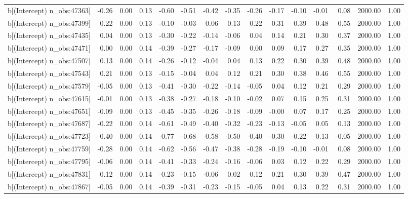 \begin{table}[ht]
\begin{tabular}{rrrrrrrrrrrrrrr}
  b[(Intercept) n\_obs:47363] & -0.26 & 0.00 & 0.13 & -0.60 & -0.51 & -0.42 & -0.35 & -0.26 & -0.17 & -0.10 & -0.01 & 0.08 & 2000.00 & 1.00 \\ 
  b[(Intercept) n\_obs:47399] & 0.22 & 0.00 & 0.13 & -0.10 & -0.03 & 0.06 & 0.13 & 0.22 & 0.31 & 0.39 & 0.48 & 0.55 & 2000.00 & 1.00 \\ 
  b[(Intercept) n\_obs:47435] & 0.04 & 0.00 & 0.13 & -0.30 & -0.22 & -0.14 & -0.06 & 0.04 & 0.14 & 0.21 & 0.30 & 0.37 & 2000.00 & 1.00 \\ 
  b[(Intercept) n\_obs:47471] & 0.00 & 0.00 & 0.14 & -0.39 & -0.27 & -0.17 & -0.09 & 0.00 & 0.09 & 0.17 & 0.27 & 0.35 & 2000.00 & 1.00 \\ 
  b[(Intercept) n\_obs:47507] & 0.13 & 0.00 & 0.14 & -0.26 & -0.12 & -0.04 & 0.04 & 0.13 & 0.22 & 0.30 & 0.39 & 0.48 & 2000.00 & 1.00 \\ 
  b[(Intercept) n\_obs:47543] & 0.21 & 0.00 & 0.13 & -0.15 & -0.04 & 0.04 & 0.12 & 0.21 & 0.30 & 0.38 & 0.46 & 0.55 & 2000.00 & 1.00 \\ 
  b[(Intercept) n\_obs:47579] & -0.05 & 0.00 & 0.13 & -0.41 & -0.30 & -0.22 & -0.14 & -0.05 & 0.04 & 0.12 & 0.21 & 0.29 & 2000.00 & 1.00 \\ 
  b[(Intercept) n\_obs:47615] & -0.01 & 0.00 & 0.13 & -0.38 & -0.27 & -0.18 & -0.10 & -0.02 & 0.07 & 0.15 & 0.25 & 0.31 & 2000.00 & 1.00 \\ 
  b[(Intercept) n\_obs:47651] & -0.09 & 0.00 & 0.13 & -0.45 & -0.35 & -0.26 & -0.18 & -0.09 & -0.00 & 0.07 & 0.17 & 0.25 & 2000.00 & 1.00 \\ 
  b[(Intercept) n\_obs:47687] & -0.22 & 0.00 & 0.14 & -0.61 & -0.49 & -0.40 & -0.32 & -0.23 & -0.13 & -0.05 & 0.05 & 0.13 & 2000.00 & 1.00 \\ 
  b[(Intercept) n\_obs:47723] & -0.40 & 0.00 & 0.14 & -0.77 & -0.68 & -0.58 & -0.50 & -0.40 & -0.30 & -0.22 & -0.13 & -0.05 & 2000.00 & 1.00 \\ 
  b[(Intercept) n\_obs:47759] & -0.28 & 0.00 & 0.14 & -0.62 & -0.56 & -0.47 & -0.38 & -0.28 & -0.19 & -0.10 & -0.01 & 0.08 & 2000.00 & 1.00 \\ 
  b[(Intercept) n\_obs:47795] & -0.06 & 0.00 & 0.14 & -0.41 & -0.33 & -0.24 & -0.16 & -0.06 & 0.03 & 0.12 & 0.22 & 0.29 & 2000.00 & 1.00 \\ 
  b[(Intercept) n\_obs:47831] & 0.12 & 0.00 & 0.14 & -0.23 & -0.15 & -0.06 & 0.02 & 0.12 & 0.21 & 0.30 & 0.39 & 0.47 & 2000.00 & 1.00 \\ 
  b[(Intercept) n\_obs:47867] & -0.05 & 0.00 & 0.14 & -0.39 & -0.31 & -0.23 & -0.15 & -0.05 & 0.04 & 0.13 & 0.22 & 0.31 & 2000.00 & 1.00 \\ 

\end{tabular}
\end{table}
